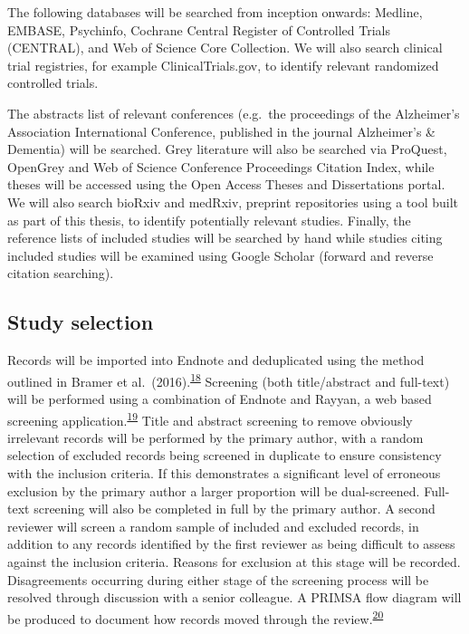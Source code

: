 \documentclass[a4paper, twoside]{templates/ociamthesis}
\begin{document}
The following databases will be searched from inception onwards: Medline, EMBASE, Psychinfo, Cochrane Central Register of Controlled Trials (CENTRAL), and Web of Science Core Collection. We will also search clinical trial registries, for example ClinicalTrials.gov, to identify relevant randomized controlled trials.

The abstracts list of relevant conferences (e.g.~the proceedings of the Alzheimer's Association International Conference, published in the journal Alzheimer's \& Dementia) will be searched. Grey literature will also be searched via ProQuest, OpenGrey and Web of Science Conference Proceedings Citation Index, while theses will be accessed using the Open Access Theses and Dissertations portal. We will also search bioRxiv and medRxiv, preprint repositories using a tool built as part of this thesis, to identify potentially relevant studies. Finally, the reference lists of included studies will be searched by hand while studies citing included studies will be examined using Google Scholar (forward and reverse citation searching).

\hypertarget{study-selection}{%
\subsection{Study selection}\label{study-selection}}

Records will be imported into Endnote and deduplicated using the method outlined in Bramer et al.~(2016).\textsuperscript{\protect\hyperlink{ref-bramer2016}{18}} Screening (both title/abstract and full-text) will be performed using a combination of Endnote and Rayyan, a web based screening application.\textsuperscript{\protect\hyperlink{ref-ouzzani2016}{19}}
Title and abstract screening to remove obviously irrelevant records will be performed by the primary author, with a random selection of excluded records being screened in duplicate to ensure consistency with the inclusion criteria. If this demonstrates a significant level of erroneous exclusion by the primary author a larger proportion will be dual-screened.
Full-text screening will also be completed in full by the primary author. A second reviewer will screen a random sample of included and excluded records, in addition to any records identified by the first reviewer as being difficult to assess against the inclusion criteria. Reasons for exclusion at this stage will be recorded. Disagreements occurring during either stage of the screening process will be resolved through discussion with a senior colleague. A PRIMSA flow diagram will be produced to document how records moved through the review.\textsuperscript{\protect\hyperlink{ref-zotero-766}{20}}
\end{document}

